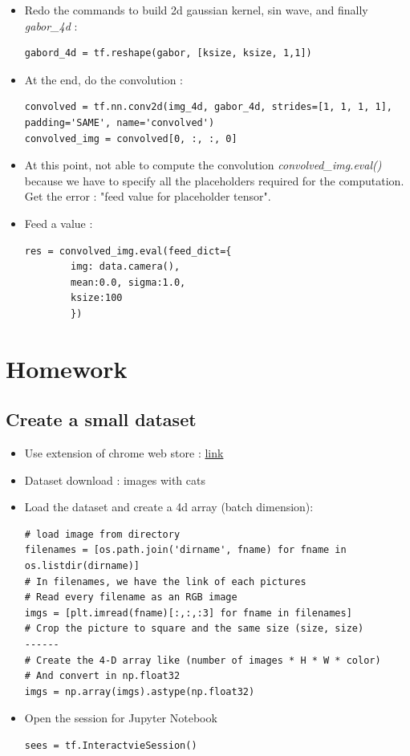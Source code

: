 \documentclass[12pt,a4paper]{article}
\begin{document}
\begin{itemize}
\begin{lstlisting}
\end{lstlisting}
\item Redo the commands to build 2d gaussian kernel, sin wave, and finally \textit{gabor\_4d} :
\begin{lstlisting}
gabord_4d = tf.reshape(gabor, [ksize, ksize, 1,1])
\end{lstlisting}
\item At the end, do the convolution :
\begin{lstlisting}
convolved = tf.nn.conv2d(img_4d, gabor_4d, strides=[1, 1, 1, 1], padding='SAME', name='convolved')
convolved_img = convolved[0, :, :, 0]
\end{lstlisting}
\item At this point, not able to compute the convolution \textit{convolved\_img.eval()} because we have to specify all the placeholders required for the computation.\\
Get the error : "feed value for placeholder tensor".
\item Feed a value :
\begin{lstlisting}
res = convolved_img.eval(feed_dict={
		img: data.camera(), 
		mean:0.0, sigma:1.0, 
		ksize:100
		})
\end{lstlisting}
\end{itemize}

\section{Homework}
\subsection{Create a small dataset}
\begin{itemize}
\item Use extension of chrome web store : \href{https://chrome.google.com/webstore/detail/download-all-images/ifipmflagepipjokmbdecpmjbibjnakm?hl=en}{link}
\item Dataset download : images with cats
\item Load the dataset and create a 4d array (batch dimension):
\begin{lstlisting}
# load image from directory
filenames = [os.path.join('dirname', fname) for fname in os.listdir(dirname)]
# In filenames, we have the link of each pictures
# Read every filename as an RGB image
imgs = [plt.imread(fname)[:,:,:3] for fname in filenames]
# Crop the picture to square and the same size (size, size)
------
# Create the 4-D array like (number of images * H * W * color)
# And convert in np.float32
imgs = np.array(imgs).astype(np.float32)
\end{lstlisting}
\item Open the session for Jupyter Notebook
\begin{lstlisting}
sees = tf.InteractvieSession()
\end{lstlisting}
\end{itemize}
\end{document}
